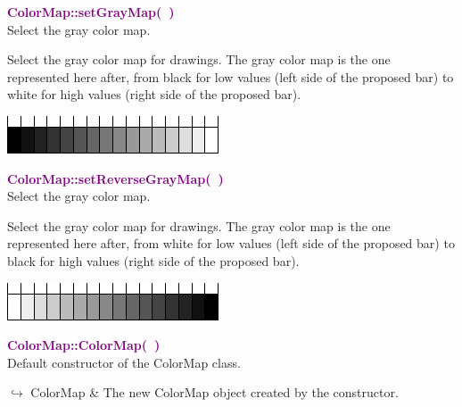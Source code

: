 \textcolor{purple}{\textbf{ColorMap::setGrayMap(~)}}\label{ColorMap::setGrayMap()}\\
Select the gray color map.

Select the gray color map for drawings.
The gray color map is the one represented here after, from black for low values (left side of the proposed bar) to white for high values (right side of the proposed bar).
\begin{center}
\includegraphics{Figures/ProgrammingLanguage/GrayMap}
\end{center}

\textcolor{purple}{\textbf{ColorMap::setReverseGrayMap(~)}}\label{ColorMap::setReverseGrayMap()}\\
Select the gray color map.

Select the gray color map for drawings.
The gray color map is the one represented here after, from white for low values (left side of the proposed bar) to black for high values (right side of the proposed bar).
\begin{center}
\includegraphics{Figures/ProgrammingLanguage/ReverseGrayMap}
\end{center}

\textcolor{purple}{\textbf{ColorMap::ColorMap(~)}}\label{ColorMap::ColorMap()}\\
Default constructor of the ColorMap class.\vspace*{-0.5em}
\begin{tcolorbox}[grow to left by=-1cm, width=\textwidth-1cm,myArgs,tabularx={l|R}]
$\hookrightarrow$ ColorMap & The new ColorMap object created by the constructor.
\end{tcolorbox}

